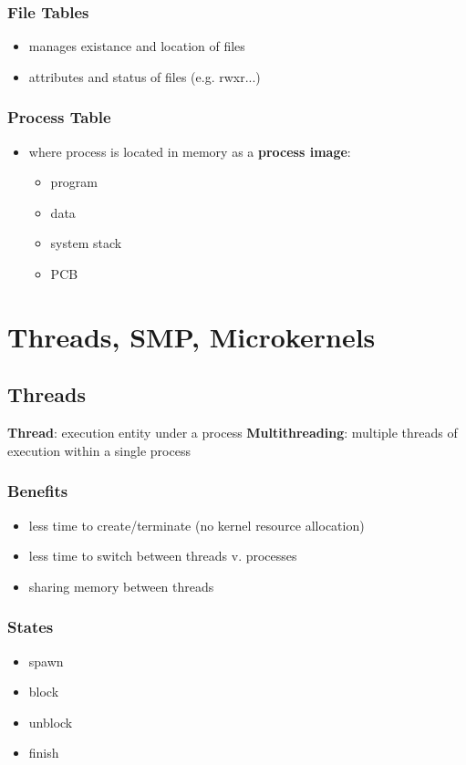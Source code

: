\documentclass[]{article}
\theoremstyle{definition}
\begin{document}
			\subsubsection{File Tables}
				\begin{itemize}
					\item manages existance and location of files
					\item attributes and status of files (e.g. rwxr...)
				\end{itemize}
			\subsubsection{Process Table}
				\begin{itemize}
					\item where process is located in memory as a \textbf{process image}:
					\begin{itemize}
						\item program
						\item data
						\item system stack
						\item PCB
					\end{itemize}
				\end{itemize}
	\section{Threads, SMP, Microkernels}
		\subsection{Threads}
			\textbf{Thread}: execution entity under a process
			\textbf{Multithreading}: multiple threads of execution within a single process
			\subsubsection{Benefits}
				\begin{itemize}
					\item less time to create/terminate (no kernel resource allocation)
					\item less time to switch between threads v. processes
					\item sharing memory between threads
				\end{itemize}
			\subsubsection{States}
				\begin{itemize}
					\item spawn
					\item block
					\item unblock
					\item finish
				\end{itemize}
\end{document}
